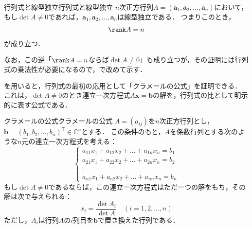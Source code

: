 \begin{prop}{行列式と線型独立}{行列式と線型独立}
  $n$次正方行列$A = (\bm{a}_1, \bm{a}_2, \dots, \bm{a}_n)$において，もし$\det A \ne 0$であれば，$\bm{a}_1, \bm{a}_2, \dots, \bm{a}_n$は線型独立である．
  つまりこのとき，
  \[
  \rank A = n
  \]
  が成り立つ．
\end{prop}

なお，この逆「$\rank A = n$ならば$\det A \ne 0$」も成り立つが，その証明には行列式の乗法性が必要になるので，で改めて示す．

を用いると，行列式の最初の応用として「クラメールの公式」を証明できる．
これは，$\det A \ne 0$のとき連立一次方程式$A\bm{x} = \bm{b}$の解を，行列式の比として明示的に表す公式である．

\begin{prop}{クラメールの公式}{クラメールの公式}
  $A = (a_{ij})$を$n$次正方行列とし，
  $\bm{b} = (b_1, b_2, \dots, b_n)^\mathsf{T} \in \mathbb{C}^n$とする．
  この条件のもと，$A$を係数行列とする次のような$n$元の連立一次方程式を考える：
  \[
  \begin{cases}
    a_{11} x_1 + a_{12} x_2 + \dots + a_{1n} x_n = b_1 \\
    a_{21} x_1 + a_{22} x_2 + \dots + a_{2n} x_n = b_2 \\
    \vdots \\
    a_{n1} x_1 + a_{n2} x_2 + \dots + a_{nn} x_n = b_n
  \end{cases}
  \]
  もし$\det A \ne 0$であるならば，この連立一次方程式はただ一つの解をもち，その解は次で与えられる：
  \[
  x_i = \frac{\det A_i}{\det A}
  \quad (i = 1, 2, \dots, n)
  \]
  ただし，$A_i$は行列$A$の$i$列目を$\bm{b}$で置き換えた行列である．
\end{prop}

